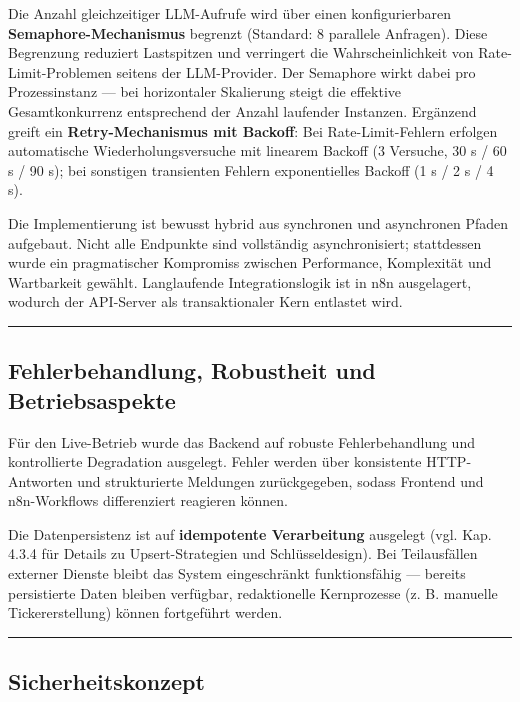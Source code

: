 Die Anzahl gleichzeitiger LLM-Aufrufe wird über einen konfigurierbaren
\textbf{Semaphore-Mechanismus} begrenzt (Standard: 8 parallele
Anfragen). Diese Begrenzung reduziert Lastspitzen und verringert die
Wahrscheinlichkeit von Rate-Limit-Problemen seitens der LLM-Provider.
Der Semaphore wirkt dabei pro Prozessinstanz --- bei horizontaler
Skalierung steigt die effektive Gesamtkonkurrenz entsprechend der Anzahl
laufender Instanzen. Ergänzend greift ein \textbf{Retry-Mechanismus mit
Backoff}: Bei Rate-Limit-Fehlern erfolgen automatische
Wiederholungsversuche mit linearem Backoff (3 Versuche, 30 s / 60 s / 90
s); bei sonstigen transienten Fehlern exponentielles Backoff (1 s / 2 s
/ 4 s).

Die Implementierung ist bewusst hybrid aus synchronen und asynchronen
Pfaden aufgebaut. Nicht alle Endpunkte sind vollständig asynchronisiert;
stattdessen wurde ein pragmatischer Kompromiss zwischen Performance,
Komplexität und Wartbarkeit gewählt. Langlaufende Integrationslogik ist
in n8n ausgelagert, wodurch der API-Server als transaktionaler Kern
entlastet wird.

\begin{center}\rule{0.5\linewidth}{0.5pt}\end{center}

\subsection{Fehlerbehandlung, Robustheit und
Betriebsaspekte}\label{fehlerbehandlung-robustheit-und-betriebsaspekte}

Für den Live-Betrieb wurde das Backend auf robuste Fehlerbehandlung und
kontrollierte Degradation ausgelegt. Fehler werden über konsistente
HTTP-Antworten und strukturierte Meldungen zurückgegeben, sodass
Frontend und n8n-Workflows differenziert reagieren können.

Die Datenpersistenz ist auf \textbf{idempotente Verarbeitung} ausgelegt
(vgl. Kap. 4.3.4 für Details zu Upsert-Strategien und Schlüsseldesign).
Bei Teilausfällen externer Dienste bleibt das System eingeschränkt
funktionsfähig --- bereits persistierte Daten bleiben verfügbar,
redaktionelle Kernprozesse (z. B. manuelle Tickererstellung) können
fortgeführt werden.

\begin{center}\rule{0.5\linewidth}{0.5pt}\end{center}

\subsection{Sicherheitskonzept}\label{sicherheitskonzept}

